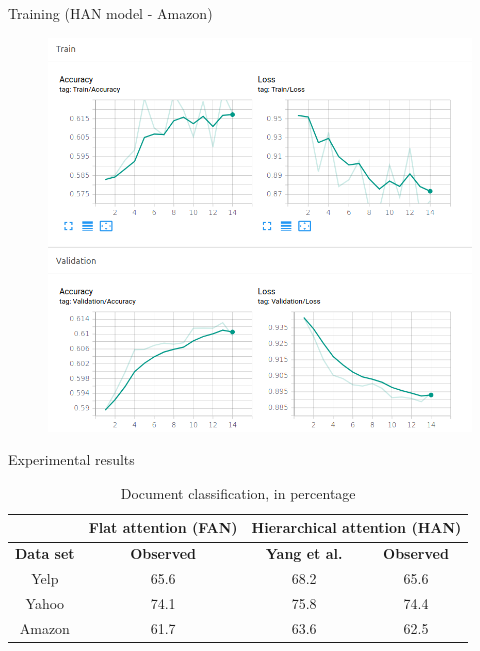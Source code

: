\documentclass[10pt]{beamer}
\begin{document}
\begin{frame}{Training (HAN model - Amazon)}

\begin{figure}[H]
\centering
\includegraphics[scale=0.3]{img/amazon-han.png}
\end{figure}

\end{frame}


\begin{frame}{Experimental results}

\begin{table}[]
\begin{tabular}{c|c|c|c|}
\cline{2-4}
                       & \textbf{Flat attention (FAN)} & \multicolumn{2}{c|}{\textbf{Hierarchical attention (HAN)}} \\
\hline
\multicolumn{1}{|c|}{\textbf{Data set}} & \textbf{Observed} &  \textbf{Yang et al. \cite{yang2016hierarchical}} & \textbf{Observed} \\
\hline
\multicolumn{1}{|c|}{Yelp} & 65.6 & 68.2 & 65.6 \\
\hline
\multicolumn{1}{|c|}{Yahoo} & 74.1 & 75.8 & 74.4 \\
\hline
\multicolumn{1}{|c|}{Amazon} & 61.7 & 63.6 & 62.5 \\
\hline
\end{tabular}
\caption{\small{Document classification, in percentage}}
\end{table}

\end{frame}
\end{document}

